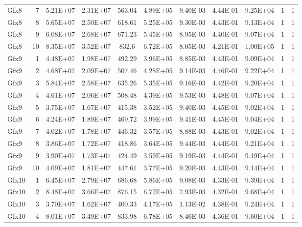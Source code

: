 \begin{longtable}{@{}l!{\vrule}r!{\vrule}c!{\vrule}c!{\vrule}c!{\vrule}c!{\vrule}c!{\vrule}c!{\vrule}c!{\vrule}c!{\vrule}c@{}}
Gfx8 & 7 & 5.21E+07 & 2.31E+07 & 563.04 & 4.89E+05 & 9.40E-03 & 4.44E-01 & 9.25E+04 & 1 & 1 \\
Gfx8 & 8 & 5.65E+07 & 2.50E+07 & 618.61 & 5.25E+05 & 9.30E-03 & 4.43E-01 & 9.13E+04 & 1 & 1 \\
Gfx8 & 9 & 6.08E+07 & 2.68E+07 & 671.23 & 5.45E+05 & 8.95E-03 & 4.40E-01 & 9.07E+04 & 1 & 1 \\
Gfx8 & 10 & 8.35E+07 & 3.52E+07 & 832.6 & 6.72E+05 & 8.05E-03 & 4.21E-01 & 1.00E+05 & 1 & 1 \\
\hline
Gfx9 & 1 & 4.48E+07 & 1.98E+07 & 492.29 & 3.96E+05 & 8.85E-03 & 4.43E-01 & 9.09E+04 & 1 & 1 \\
Gfx9 & 2 & 4.68E+07 & 2.09E+07 & 507.46 & 4.28E+05 & 9.14E-03 & 4.46E-01 & 9.22E+04 & 1 & 1 \\
Gfx9 & 3 & 5.84E+07 & 2.58E+07 & 635.26 & 5.35E+05 & 9.16E-03 & 4.42E-01 & 9.20E+04 & 1 & 1 \\
Gfx9 & 4 & 4.61E+07 & 2.06E+07 & 508.48 & 4.39E+05 & 9.53E-03 & 4.48E-01 & 9.07E+04 & 1 & 1 \\
Gfx9 & 5 & 3.75E+07 & 1.67E+07 & 415.38 & 3.52E+05 & 9.40E-03 & 4.45E-01 & 9.02E+04 & 1 & 1 \\
Gfx9 & 6 & 4.24E+07 & 1.89E+07 & 469.72 & 3.99E+05 & 9.41E-03 & 4.45E-01 & 9.04E+04 & 1 & 1 \\
Gfx9 & 7 & 4.02E+07 & 1.78E+07 & 446.32 & 3.57E+05 & 8.88E-03 & 4.43E-01 & 9.02E+04 & 1 & 1 \\
Gfx9 & 8 & 3.86E+07 & 1.72E+07 & 418.86 & 3.64E+05 & 9.44E-03 & 4.44E-01 & 9.21E+04 & 1 & 1 \\
Gfx9 & 9 & 3.90E+07 & 1.73E+07 & 424.49 & 3.59E+05 & 9.19E-03 & 4.44E-01 & 9.19E+04 & 1 & 1 \\
Gfx9 & 10 & 4.09E+07 & 1.81E+07 & 447.61 & 3.77E+05 & 9.20E-03 & 4.43E-01 & 9.14E+04 & 1 & 1 \\
\hline
{}
Gfx10 & 1 & 6.45E+07 & 2.79E+07 & 686.68 & 5.86E+05 & 9.08E-03 & 4.33E-01 & 9.39E+04 & 1 & 1 \\
Gfx10 & 2 & 8.48E+07 & 3.66E+07 & 876.15 & 6.72E+05 & 7.93E-03 & 4.32E-01 & 9.68E+04 & 1 & 1 \\
Gfx10 & 3 & 3.70E+07 & 1.62E+07 & 400.33 & 4.17E+05 & 1.13E-02 & 4.38E-01 & 9.24E+04 & 1 & 1 \\
Gfx10 & 4 & 8.01E+07 & 3.49E+07 & 833.98 & 6.78E+05 & 8.46E-03 & 4.36E-01 & 9.60E+04 & 1 & 1 \\

\end{longtable}

